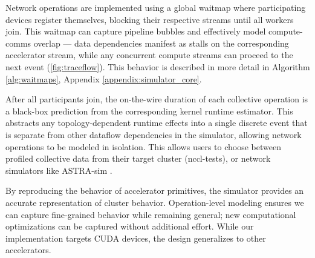  Network operations are implemented using a global waitmap where participating devices register themselves, blocking their respective streams until all workers join. This waitmap can capture pipeline bubbles and effectively model compute-comms overlap --- data dependencies manifest as stalls on the corresponding accelerator stream, while any concurrent compute streams can proceed to the next event (\autoref{fig:traceflow}). This behavior is described in more detail in Algorithm \ref{alg:waitmaps}, Appendix \ref{appendix:simulator_core}.

After all participants join, the on-the-wire duration of each collective operation is a black-box prediction from the corresponding kernel runtime estimator. This abstracts any topology-dependent runtime effects into a single discrete event that is separate from other dataflow dependencies in the simulator, allowing network operations to be modeled in isolation. This allows users to choose between profiled collective data from their target cluster (nccl-tests), or network simulators like ASTRA-sim \cite{won2023astra}.

By reproducing the behavior of accelerator primitives, the simulator provides an accurate representation of cluster behavior. Operation-level modeling ensures we can capture fine-grained behavior while remaining general; new computational optimizations can be captured without additional effort. While our implementation targets CUDA devices, the design generalizes to other accelerators.
